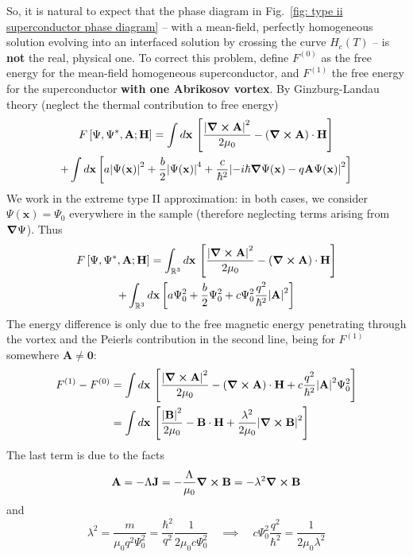So, it is natural to expect that the phase diagram in Fig.~\ref{fig: type ii superconductor phase diagram} -- with a mean-field, perfectly homogeneous solution evolving into an interfaced solution by crossing the curve $H_c(T)$ -- is \textbf{not} the real, physical one. To correct this problem, define $F^{(0)}$ as the free energy for the mean-field homogeneous superconductor, and $F^{(1)}$ the free energy for the superconductor \textbf{with one Abrikosov vortex}. By Ginzburg-Landau theory (neglect the thermal contribution to free energy)
\begin{multline*}
    F \left[{ \Psi,\Psi^*,\mathbf{A}; \mathbf{H}}\right] = \int d\mathbf{x} \, \left[{ \frac{\abs{\curl\mathbf{A}}^2}{2\mu_0} - \left({ \curl\mathbf{A} }\right) \cdot \mathbf{H} }\right] \\
    + \int d\mathbf{x} \left[{
        a \abs{\Psi(\mathbf{x)} }^2 + \frac{b}{2} \abs{ \Psi(\mathbf{x)} }^4 + \frac{c}{\hbar^2} \abs{-i\hbar\grad \Psi(\mathbf{x)} - q \mathbf{A} \Psi(\mathbf{x)} }^2
    }\right]
\end{multline*}
We work in the extreme type II approximation: in both cases, we consider $\Psi(\mathbf{x}) = \Psi_0$ everywhere in the sample (therefore neglecting terms arising from $\grad\Psi$). Thus
\begin{multline*}
    F \left[{ \Psi,\Psi^*,\mathbf{A}; \mathbf{H}}\right] = \int_{\mathbb{R}^3} d\mathbf{x} \, \left[{ \frac{\abs{\curl\mathbf{A}}^2}{2\mu_0} - \left({ \curl\mathbf{A} }\right) \cdot \mathbf{H} }\right] \\
    + \int_{\mathbb{R}^3} d\mathbf{x} \left[{
        a \Psi_0^2 + \frac{b}{2} \Psi_0^2 + c\Psi_0^2 \frac{q^2}{\hbar^2} \abs{\mathbf{A}}^2
    }\right]
\end{multline*}
The energy difference is only due to the free magnetic energy penetrating through the vortex and the Peierls contribution in the second line, being for $F^{(1)}$ somewhere $\mathbf{A}\neq\mathbf{0}$:
\[
\begin{aligned}
    F^{(1)} - F^{(0)} &= \int d\mathbf{x} \, \left[{ \frac{\abs{\curl\mathbf{A}}^2}{2\mu_0} - \left({ \curl\mathbf{A} }\right) \cdot \mathbf{H} + c \frac{q^2}{\hbar^2} \abs{\mathbf{A}}^2 \Psi_0^2}\right] \\
    &= \int d\mathbf{x} \, \left[{ \frac{\abs{\mathbf{B}}^2}{2\mu_0} - \mathbf{B}\cdot\mathbf{H} + \frac{\lambda^2}{2\mu_0} \abs{\curl\mathbf{B}}^2}\right]
\end{aligned}
\]
The last term is due to the facts
\[
    \mathbf{A} = - \Lambda\mathbf{J} = - \frac{\Lambda}{\mu_0} \curl\mathbf{B} = - \lambda^2 \curl\mathbf{B}
\]
and
\[
    \lambda^2 = \frac{m}{\mu_0 q^2 \Psi_0^2} = \frac{\hbar^2}{q^2} \frac{1}{2 \mu_0 c \Psi_0^2}
    \quad\implies\quad
    c\Psi_0^2 \frac{q^2}{\hbar^2} = \frac{1}{2\mu_0 \lambda^2}
\]
